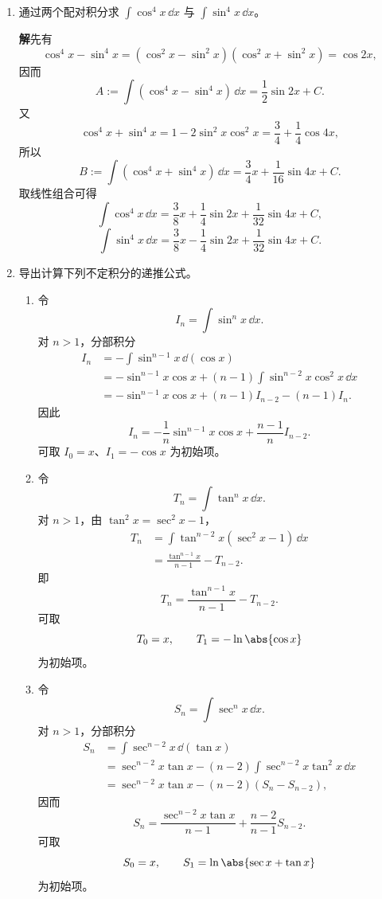 \begin{enumerate}
  \item 通过两个配对积分求 $\int\cos^4x\,\dd x$ 与 $\int\sin^4x\,\dd x$。

  \textbf{解}\quad 先有
  \[
    \cos^4x-\sin^4x=(\cos^2x-\sin^2x)(\cos^2x+\sin^2x)=\cos2x,
  \]
  因而
  \[
    A:=\int(\cos^4x-\sin^4x)\,\dd x
    =\frac12\sin2x+C.
  \]
  又
  \[
    \cos^4x+\sin^4x
    =1-2\sin^2x\cos^2x
    =\frac34+\frac14\cos4x,
  \]
  所以
  \[
    B:=\int(\cos^4x+\sin^4x)\,\dd x
    =\frac34x+\frac1{16}\sin4x+C.
  \]
  取线性组合可得
  \[
    \boxed{
    \int\cos^4x\,\dd x
    =\frac38x+\frac14\sin2x+\frac1{32}\sin4x+C},
  \]
  \[
    \boxed{
    \int\sin^4x\,\dd x
    =\frac38x-\frac14\sin2x+\frac1{32}\sin4x+C}.
  \]

  \item 导出计算下列不定积分的递推公式。
  \begin{enumerate}[label=(\arabic*)]
    \item 令
    \[
      I_n=\int\sin^nx\,\dd x.
    \]
    对 $n>1$，分部积分
    \begin{align*}
      I_n
      &=-\int\sin^{n-1}x\,\dd(\cos x)\\
      &=-\sin^{n-1}x\cos x
        +(n-1)\int\sin^{n-2}x\cos^2x\,\dd x\\
      &=-\sin^{n-1}x\cos x+(n-1)I_{n-2}-(n-1)I_n.
    \end{align*}
    因此
    \[
      \boxed{I_n=-\frac1n\sin^{n-1}x\cos x+\frac{n-1}{n}I_{n-2}}.
    \]
    可取 $I_0=x$、$I_1=-\cos x$ 为初始项。

    \item 令
    \[
      T_n=\int\tan^nx\,\dd x.
    \]
    对 $n>1$，由 $\tan^2x=\sec^2x-1$，
    \begin{align*}
      T_n
      &=\int\tan^{n-2}x(\sec^2x-1)\,\dd x\\
      &=\frac{\tan^{n-1}x}{n-1}-T_{n-2}.
    \end{align*}
    即
    \[
      \boxed{T_n=\frac{\tan^{n-1}x}{n-1}-T_{n-2}}.
    \]
    可取
    \[
      T_0=x,
      \qquad
      T_1=-\ln\abs{\cos x}
    \]
    为初始项。

    \item 令
    \[
      S_n=\int\sec^nx\,\dd x.
    \]
    对 $n>1$，分部积分
    \begin{align*}
      S_n
      &=\int\sec^{n-2}x\,\dd(\tan x)\\
      &=\sec^{n-2}x\tan x
        -(n-2)\int\sec^{n-2}x\tan^2x\,\dd x\\
      &=\sec^{n-2}x\tan x-(n-2)(S_n-S_{n-2}),
    \end{align*}
    因而
    \[
      \boxed{S_n=\frac{\sec^{n-2}x\tan x}{n-1}
      +\frac{n-2}{n-1}S_{n-2}}.
    \]
    可取
    \[
      S_0=x,
      \qquad
      S_1=\ln\abs{\sec x+\tan x}
    \]
    为初始项。


\end{enumerate}
\end{enumerate}
